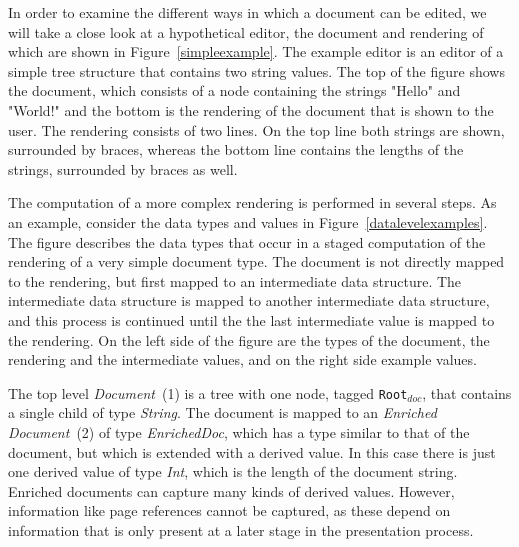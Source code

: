 \documentclass[twoside,epsf]{report}
\begin{document}
In order to examine the different ways in which a document can be edited, we will take a close look at a hypothetical editor, the document and rendering of which are shown in Figure~\ref{simpleexample}. The example editor is an editor of a simple tree structure that contains two string values. The top of the figure shows the document, which consists of a node containing the strings "Hello" and "World!" and the bottom is the rendering of the document that is shown to the user. The rendering consists of two lines. On the top line both strings are shown, surrounded by braces, whereas the bottom line contains the lengths of the strings, surrounded by braces as well. 

The computation of a more complex rendering is performed in several steps. As an example, consider the data types and values in Figure~\ref{datalevelexamples}. The figure describes the data types that occur in a staged computation of the rendering of a very simple document type. The document is not directly mapped to the rendering, but first mapped to an intermediate data structure. The intermediate data structure is mapped to another intermediate data structure, and this process is continued until the the last intermediate value is mapped to the rendering. On the left side of the figure are the types of the document, the rendering and the intermediate values, and on the right side example values. 

The top level {\em Document}~(1) is a tree with one node, tagged \texttt{Root}$_{doc}$, that contains a single child of type {\em String}. The document is mapped to an {\em Enriched Document}~(2) of type {\em EnrichedDoc}, which has a type similar to that of the document, but which is extended with a derived value. In this case there is just one derived value of type {\em Int}, which is the length of the document string. Enriched documents can capture many kinds of derived values. However, information like page references cannot be captured, as these depend on information that is only present at a later stage in the presentation process. 
\end{document}
